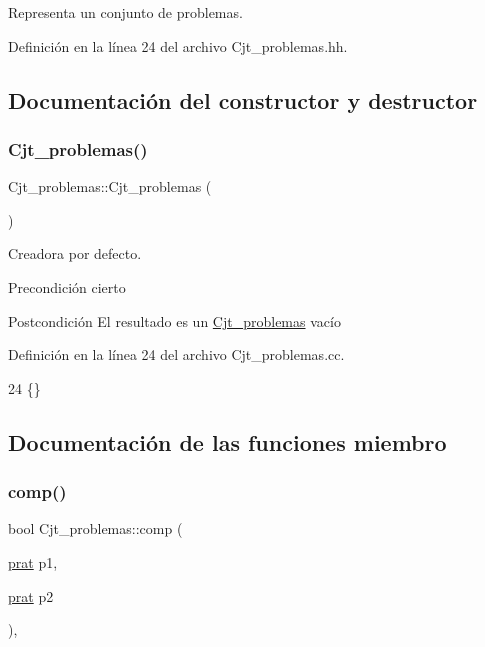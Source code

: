 Representa un conjunto de problemas. 

Definición en la línea 24 del archivo Cjt\+\_\+problemas.\+hh.



\subsection{Documentación del constructor y destructor}
\mbox{\label{class_cjt__problemas_abc8bb814818ed290a0a99636cdca8519}} 
\subsubsection{\texorpdfstring{Cjt\+\_\+problemas()}{Cjt\_problemas()}}
{\footnotesize\ttfamily Cjt\+\_\+problemas\+::\+Cjt\+\_\+problemas (\begin{DoxyParamCaption}{ }\end{DoxyParamCaption})}



Creadora por defecto. 

\begin{DoxyPrecond}{Precondición}
cierto 
\end{DoxyPrecond}
\begin{DoxyPostcond}{Postcondición}
El resultado es un \mbox{\hyperlink{class_cjt__problemas}{Cjt\+\_\+problemas}} vacío 
\end{DoxyPostcond}


Definición en la línea 24 del archivo Cjt\+\_\+problemas.\+cc.


\begin{DoxyCode}
24 \{\}
\end{DoxyCode}


\subsection{Documentación de las funciones miembro}
\mbox{\label{class_cjt__problemas_ae5b468db02077990aedcd73835aaa9e1}} 
\subsubsection{\texorpdfstring{comp()}{comp()}}
{\footnotesize\ttfamily bool Cjt\+\_\+problemas\+::comp (\begin{DoxyParamCaption}\item[{\mbox{\hyperlink{struct_cjt__problemas_1_1prat}{prat}}}]{p1,  }\item[{\mbox{\hyperlink{struct_cjt__problemas_1_1prat}{prat}}}]{p2 }\end{DoxyParamCaption})\hspace{0.3cm}{\ttfamily [static]}, {\ttfamily [private]}}



